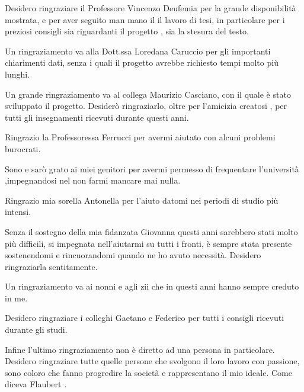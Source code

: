 Desidero ringraziare il Professore Vincenzo Deufemia per la grande disponibilità mostrata, e per aver seguito man mano il il lavoro di tesi, in particolare per i preziosi consigli sia riguardanti il progetto , sia la stesura del testo. 

Un ringraziamento va alla Dott.ssa Loredana Caruccio per gli importanti chiarimenti dati, senza i quali il progetto avrebbe richiesto tempi molto più lunghi.

Un grande ringraziamento va al collega Maurizio Casciano, con il quale è stato sviluppato il progetto. Desiderò  ringraziarlo, oltre per l'amicizia creatosi , per tutti gli insegnamenti ricevuti durante questi anni.

Ringrazio la Professoressa Ferrucci per avermi aiutato con alcuni problemi burocrati.

Sono e sarò grato ai miei genitori per avermi permesso di frequentare l'università ,impegnandosi nel non farmi mancare mai nulla.

Ringrazio mia sorella Antonella per l'aiuto datomi nei periodi di studio più intensi.

Senza il sostegno della mia fidanzata Giovanna questi anni sarebbero stati molto più difficili, si impegnata nell'aiutarmi su tutti i fronti, è sempre stata presente sostenendomi e rincuorandomi quando ne ho avuto necessità. Desidero ringraziarla sentitamente.

Un ringraziamento va ai nonni e agli zii che in questi anni hanno sempre creduto in me.

Desidero ringraziare i colleghi Gaetano e Federico per tutti i consigli ricevuti durante gli studi.

Infine l'ultimo ringraziamento non è diretto ad una persona in particolare. Desidero ringraziare tutte quelle persone che svolgono il loro lavoro con passione, sono coloro che fanno progredire la società e rappresentano il mio ideale. Come diceva Flaubert \textit{.}




